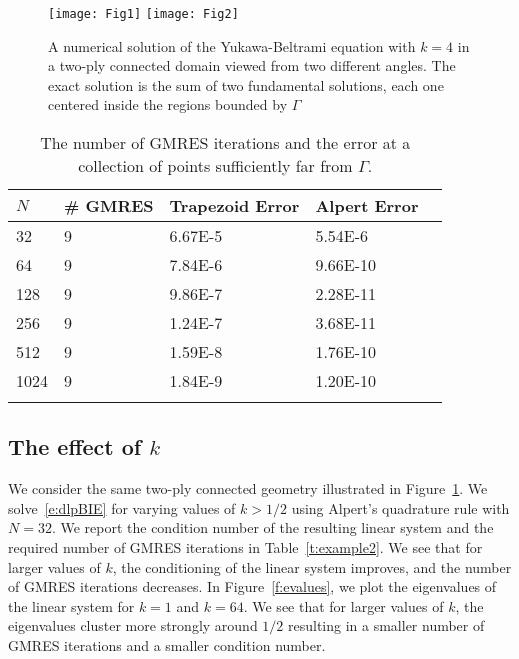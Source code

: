 \begin{figure}[htps]
  \texttt{[image: Fig1]}
  \texttt{[image: Fig2]}
\caption{\label{f:twoply} A numerical solution of the Yukawa-Beltrami
equation with $k=4$ in a two-ply connected domain viewed from two
different angles.  The exact solution is the sum of two fundamental
solutions, each one centered inside the regions bounded by $\Gamma$}
\end{figure}

\begin{table}[htps]
\caption{\label{t:example1} The number of GMRES iterations and the
error at a collection of points sufficiently far from $\Gamma$.}
\centering
\begin{tabular*}{0.8\textwidth}{@{\extracolsep{\fill}}lllll}
$N$ & \# GMRES & Trapezoid Error & Alpert Error  \\
\hline\noalign{\smallskip}
32   & 9 & 6.67E-5 & 5.54E-6  \\
64   & 9 & 7.84E-6 & 9.66E-10 \\
128  & 9 & 9.86E-7 & 2.28E-11 \\
256  & 9 & 1.24E-7 & 3.68E-11 \\
512  & 9 & 1.59E-8 & 1.76E-10 \\  
1024 & 9 & 1.84E-9 & 1.20E-10 \\ 
\noalign{\smallskip}\hline
\end{tabular*}
\end{table}

\subsection{The effect of $k$}
We consider the same two-ply connected geometry illustrated in
Figure~\ref{f:twoply}.  We solve~\eqref{e:dlpBIE} for varying values of
$k > 1/2$ using Alpert's quadrature rule with $N=32$.  We report the
condition number of the resulting linear system and the required number
of GMRES iterations in Table~\ref{t:example2}.  We see that for larger
values of $k$, the conditioning of the linear system improves, and the
number of GMRES iterations decreases.  In Figure~\ref{f:evalues}, we
plot the eigenvalues of the linear system for $k=1$ and $k=64$.  We see
that for larger values of $k$, the eigenvalues cluster more strongly
around $1/2$ resulting in a smaller number of GMRES iterations and a
smaller condition number.

